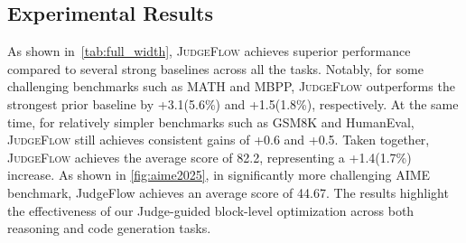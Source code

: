 \documentclass{article}
\theoremstyle{plain}
\theoremstyle{definition}
\theoremstyle{remark}
\def \our{\textsc{JudgeFlow}}
\begin{document}
\subsection{Experimental Results}

As shown in~\cref{tab:full_width}, \our{} achieves superior performance compared to several strong baselines across all the tasks. Notably, for some challenging benchmarks such as MATH and MBPP, \our{} outperforms the strongest prior baseline by +3.1(5.6\%) and +1.5(1.8\%), respectively. At the same time, for relatively simpler benchmarks such as GSM8K and HumanEval, \our{} still achieves consistent gains of +0.6 and +0.5. Taken together, \our{} achieves the average score of 82.2, representing a +1.4(1.7\%) increase. As shown in \cref{fig:aime2025}, in significantly more challenging AIME benchmark, JudgeFlow achieves an average score of {44.67}. The results highlight the effectiveness of our Judge-guided block-level optimization across both reasoning and code generation tasks. 
\end{document}
